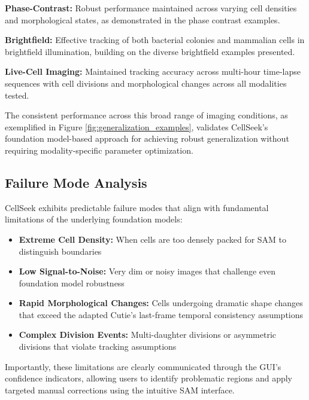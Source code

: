 \documentclass[../cellseek_paper.tex]{subfiles}
\begin{document}
\textbf{Phase-Contrast:} Robust performance maintained across varying cell densities and morphological states, as demonstrated in the phase contrast examples.

\textbf{Brightfield:} Effective tracking of both bacterial colonies and mammalian cells in brightfield illumination, building on the diverse brightfield examples presented.

\textbf{Live-Cell Imaging:} Maintained tracking accuracy across multi-hour time-lapse sequences with cell divisions and morphological changes across all modalities tested.

The consistent performance across this broad range of imaging conditions, as exemplified in Figure \ref{fig:generalization_examples}, validates CellSeek's foundation model-based approach for achieving robust generalization without requiring modality-specific parameter optimization.

\subsection{Failure Mode Analysis}

CellSeek exhibits predictable failure modes that align with fundamental limitations of the underlying foundation models:

\begin{itemize}
  \item \textbf{Extreme Cell Density:} When cells are too densely packed for SAM to distinguish boundaries
  \item \textbf{Low Signal-to-Noise:} Very dim or noisy images that challenge even foundation model robustness
  \item \textbf{Rapid Morphological Changes:} Cells undergoing dramatic shape changes that exceed the adapted Cutie's last-frame temporal consistency assumptions
  \item \textbf{Complex Division Events:} Multi-daughter divisions or asymmetric divisions that violate tracking assumptions
\end{itemize}

Importantly, these limitations are clearly communicated through the GUI's confidence indicators, allowing users to identify problematic regions and apply targeted manual corrections using the intuitive SAM interface.
\end{document}
